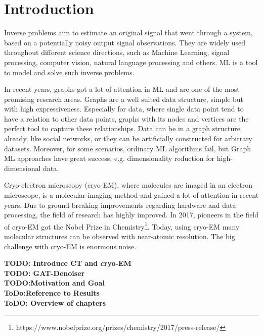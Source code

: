 \chapter{Introduction}
\label{sec:introduction}

Inverse problems aim to estimate an original signal that went through a system, 
based on a potentially noisy output signal observations.
They are widely used throughout different science directions, such as Machine Learning,
signal processing, computer vision, natural language processing and others.
ML is a tool to model and solve such inverse problems.


\bigskip

In recent years, graphs got a lot of attention in ML and are one of the most promising research areas.
Graphs are a well suited data structure, simple but with high expressiveness. 
Especially for data, where single data point tend to have a relation to other data points, graphs with its nodes and vertices are the perfect tool
to capture these relationships. 
Data can be in a graph structure already, like social networks, or they can be artificially constructed for arbitrary datasets.
Moreover, for some scenarios, ordinary ML algorithms fail, but Graph ML approaches have great success, e.g. dimensionality reduction for high-dimensional data.


\bigskip

Cryo-electron microscopy (cryo-EM), where molecules are imaged in an electron microscope,
is a molecular imaging method and gained a lot of attention in recent years. 
Due to ground-breaking improvements regarding hardware and data processing, the field of research
has highly improved. In 2017, pioneers in the field of cryo-EM got the 
Nobel Prize in Chemistry\footnote{https://www.nobelprize.org/prizes/chemistry/2017/press-release/}.
Today, using cryo-EM many molecular structures can be observed with near-atomic resolution.
The big challenge with cryo-EM is enormous noise.


\textbf{TODO: Introduce CT and cryo-EM} \\

\textbf{TODO: GAT-Denoiser} \\

\textbf{TODO:Motivation and Goal} \\

\textbf{ToDo:Reference to Results} \\

\textbf{ToDO: Overview of chapters} \\

